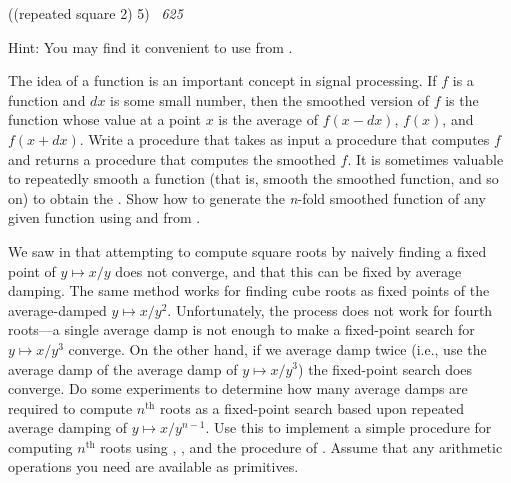 \begin{exerciseGroup}
\begin{codeBlock}
((repeated square 2) 5)
~\textit{625}~
\end{codeBlock}

Hint: You may find it convenient to use  from .

\label{Exercise 1.44}
 The idea of  a
function is an important concept in signal processing.  If \( f \) is a function
and \( dx \) is some small number, then the smoothed version of \( f \) is the
function whose value at a point \( x \) is the average of \( f(x - dx) \),
\( f(x) \), and \( f(x + dx) \).  Write a procedure
 that takes as input a procedure that computes \( f \) and returns a
procedure that computes the smoothed \( f \).  It is sometimes valuable to
repeatedly smooth a function (that is, smooth the smoothed function, and so on)
to obtain the .  Show how to generate
the \textit{n}-fold smoothed function of any given function using  and
 from .

\label{Exercise 1.45}
 We saw in 
that attempting to compute square roots by naively finding a fixed point of
\( y \mapsto x / y \) does not converge, and that this can be fixed by average
damping.  The same method works for finding cube roots as fixed points of the
average-damped \( y \mapsto x / y^2 \).  Unfortunately, the process does not
work for fourth roots---a single average damp is not enough to make a
fixed-point search for \( y \mapsto x / y^3 \) converge.  On the other hand, if
we average damp twice (i.e., use the average damp of the average damp of
\( y \mapsto x / y^3 \)) the fixed-point search does converge.  Do some experiments
to determine how many average damps are required to compute \( n^{\mathrm{th}} \) roots as a
fixed-point search based upon repeated average damping of \( y \mapsto x / y^{n-1} \).
Use this to implement a simple procedure for computing
\( n^{\mathrm{th}} \) roots using , , and the
 procedure of .  Assume that any arithmetic
operations you need are available as primitives.


\end{exerciseGroup}
